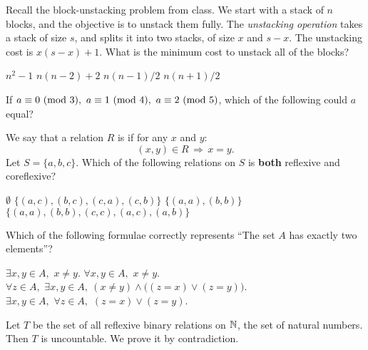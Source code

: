 \begin{questions}
\vspace{1.8in}

\question Recall the block-unstacking problem from class. 
We start with a stack of $n$ blocks, and the objective is to unstack them fully. 
The \emph{unstacking operation} takes a stack of size $s$, and splits it into two stacks, of size $x$ and $s-x$. 
The unstacking cost is $x(s-x) + 1$.  What is the minimum cost to unstack all of the blocks? 
\begin{choices}
\choice $n^2-1$
\choice $n(n-2) + 2$
\choice $n(n-1)/2$ 
\choice $n(n+1)/2$
\choice {}
\end{choices}

\newpage

\question If $a \equiv 0 \Mod 3,\ a \equiv 1 \Mod 4,\ a \equiv 2 \Mod 5$, which of the following could $a$ equal?
\begin{choices}
\choice {}
\end{choices}

\vspace{1.8in}

\question We say that a relation $R$ is  if for any $x$ and $y$: 
$$ %
(x,y)\in R \, \Rightarrow\,  x=y.$$  
Let $S = \{a, b, c\}$.  Which of the following relations on $S$ is
{\bf both} reflexive and coreflexive?
\begin{choices}
\choice $\emptyset$
\choice $\{(a,c),(b,c),(c,a),(c,b)\}$
\choice {}
\choice $\{(a,a),(b,b)\}$
\choice $\{(a,a),(b,b),(c,c),(a,c),(a,b)\}$
\end{choices}

\newpage

\question Which of the following formulae correctly represents ``The set $A$ has exactly two elements''?
\begin{choices}
\choice $\exists x,y\in A,\,\, x\neq y$.
\choice $\forall x,y\in A,\,\, x\neq y$.
\choice $\forall z\in A,\,\, \exists x,y\in A,\ (x\neq y)\land \big( (z=x) \lor (z=y) \big)$.
\choice {}
\choice $\exists x,y\in A,\,\, \forall z\in A,\,\, (z=x) \lor (z=y)$.
\end{choices}

\vspace{1.8in}


\question Let $T$ be the set of all reflexive binary relations on ${\mathbb N}{}$, the set of natural numbers. Then $T$ is uncountable. We prove it by contradiction.\\


\end{questions}
